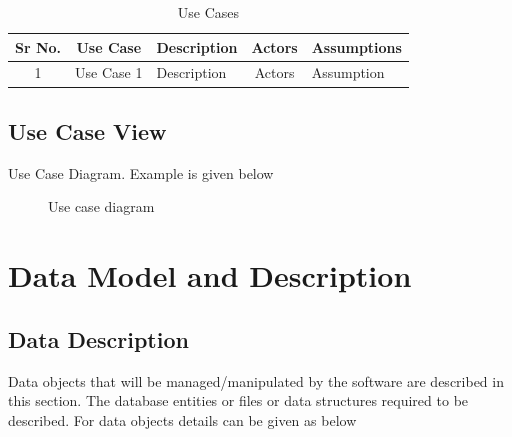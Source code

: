\documentclass[oneside,a4paper,12pt]{report}
\begin{document}
\begin{table}[!htbp]
\begin{center}
\def\arraystretch{1.5}
\begin{tabularx}{\textwidth}{| c | c | X | c | X |}
\hline
Sr No.	& Use Case	& Description	& Actors	& Assumptions \\
\hline
1& Use Case 1 & Description & Actors & Assumption \\
\hline
\end{tabularx}
\end{center}
\caption{Use Cases}
\label{tab:usecase}
\end{table}


\subsection{Use Case View}
Use Case Diagram. Example is given below
\begin{center}
	\begin{figure}[!htbp]
		\centering
	  \caption{Use case diagram}
	  \label{fig:usecase}
	\end{figure}
\end{center}

\section{Data Model and Description}
\subsection{Data Description}
Data objects that will be managed/manipulated by the software are described in this section. The database entities or files or data structures  required to be described. For data objects details can be given as below
\end{document}
